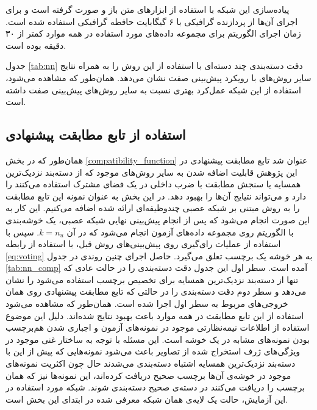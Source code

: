  پیاده‌سازی این شبکه با استفاده از ابزارهای متن باز
 \cite{theano}
و
  \cite{keras}
صورت گرفته است و برای اجرای آن‌ها از پردازنده گرافیکی
با ۶ گیگابایت حافظه گرافیکی
استفاده شده است.
 زمان اجرای الگوریتم برای مجموعه داده‌های مورد استفاده در همه موارد کمتر از ۳۰ دقیقه بوده است.


جدول \ref{tab:nn} دقت دسته‌بندی چند دسته‌ای با استفاده از این روش را به همراه نتایج سایر روش‌های با رویکرد پیش‌بینی صفت نشان می‌دهد. همان‌طور که مشاهده می‌شود، استفاده از این شبکه عمل‌کرد بهتری نسبت به سایر روش‌های پیش‌بینی صفت داشته است.
\subsection{استفاده از تابع مطابقت پیشنهادی}\label{exp:nn_comp}
همان‌طور که در بخش \ref{compatibility_function} عنوان شد تابع مطابقت پیشنهادی  در این پژوهش قابلیت اضافه شدن به سایر روش‌های موجود که از دسته‌بند نزدیک‌ترین همسایه یا سنجش مطابقت با ضرب داخلی در یک فضای مشترک استفاده می‌کنند را دارد و می‌تواند نتیایج آن‌ها را بهبود دهد. در این بخش به عنوان نمونه این تابع مطابقت را به روش مبتنی بر شبکه عصبی چندوظیفه‌ای ارائه شده اضافه می‌کنیم. این کار به این صورت انجام می‌شود که پس از انجام پیش‌بینی نهایی شبکه عصبی، یک خوشه‌بندی با الگوریتم  روی مجموعه داده‌های آزمون انجام می‌شود که در آن $k=n_u$. سپس با استفاده از عملیات رای‌گیری روی پیش‌بینی‌های روش قبل، با استفاده از رابطه \eqref{eq:voting} به هر خوشه یک برچسب تعلق می‌گیرد. حاصل اجرای چنین روندی در جدول \ref{tab:nn_comp} آمده است. سطر اول این جدول دقت دسته‌بندی را در حالت عادی که تنها از دسته‌بند نزدیک‌ترین همسایه برای تخصیص برچسب استفاده می‌شود را نشان می‌دهد و سطر دوم دقت دسته‌بندی را در حالتی که تابع مطابقت پیشنهادی روی همان خروجی‌های مربوط به سطر اول اجرا شده است. همان‌طور که مشاهده می‌شود استفاده از این تابع مطابقت در همه موارد باعث بهبود نتایج شده‌اند. دلیل این موضوع استفاده از اطلاعات نیمه‌نظارتی موجود در نمونه‌های آزمون و  اجباری شدن هم‌برچسب بودن نمونه‌های مشابه در یک خوشه است.  این مسئله با توجه به ساختار غنی موجود در ویژگی‌های ژرف استخراج شده از تصاویر باعث می‌شود نمونه‌هایی که پیش از این با دسته‌بند نزدیک‌ترین همسایه اشتباه دسته‌بندی می‌شدند حال چون اکثریت نمونه‌های موجود در خوشه‌ی آن‌ها برچسب صحیح دریافت کرده‌اند، این نمونه‌ها نیز که همان برچسب را دریافت می‌کنند در دسته‌ی صحیح دسته‌بندی شوند.
 شبکه مورد استفاده در این آزمایش، حالت یک لایه‌ی همان شبکه معرفی شده در ابتدای این بخش است.
